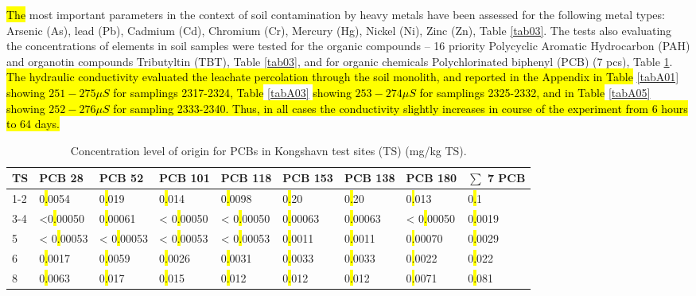 \documentclass[algorithms,article,submit,pdftex,moreauthors]{Definitions/mdpi}
\begin{document}
\hl{The} most important parameters in the context of soil contamination by heavy metals have been assessed for the following metal types: Arsenic (As), lead (Pb), Cadmium (Cd), Chromium (Cr), Mercury (Hg), Nickel (Ni), Zinc (Zn), Table \ref{tab03}. The tests also evaluating the concentrations of elements in soil samples were tested for the organic compounds -- 16 priority Polycyclic Aromatic Hydrocarbon (PAH) and organotin compounds Tributyltin (TBT), Table \ref{tab03}, and for organic chemicals Polychlorinated biphenyl (PCB) (7 pcs), Table \ref{tab04}. \hl{The hydraulic conductivity evaluated the leachate percolation through the soil monolith, and reported in the Appendix in Table} \ref{tabA01} \hl{showing $251-275 \mu S$ for samplings 2317-2324, Table} \ref{tabA03} \hl{showing $253-274 \mu S$ for samplings 2325-2332, and in Table} \ref{tabA05} \hl{showing $252-276 \mu S$ for sampling 2333-2340. Thus, in all cases the conductivity slightly increases in course of the experiment from 6 hours to 64 days.}

\begin{table}[H] 
\caption{Concentration level of origin for PCBs in Kongshavn test sites (TS) (mg/kg TS).\label{tab04}}
\begin{tabularx}{\linewidth}{p{0.5cm}p{1.3cm}p{1.3cm}p{1.3cm}p{1.3cm}p{1.2cm}p{1.2cm}p{1.3cm}p{1.3cm}}
\toprule
\textbf{TS} & \textbf{PCB 28} & \textbf{PCB 52} & \textbf{PCB 101} & \textbf{PCB 118} & \textbf{PCB 153} & \textbf{PCB 138} & \textbf{PCB 180} & \textbf{$\sum$ 7 PCB}\\
\midrule
1-2 & 0\hl{.}0054   & 0\hl{.}019     & 0\hl{.}014 	     & 0\hl{.}0098  & 0\hl{.}20     & 0\hl{.}20       & 0\hl{.}013     & 0\hl{.}1 \\
3-4 & <0\hl{.}00050 & 0\hl{.}00061 & < 0\hl{.}00050    & < 0\hl{.}00050 & 0\hl{.}00063 & 0\hl{.}00063 & < 0\hl{.}00050 & 0\hl{.}0019 \\
5 & < 0\hl{.}00053 & < 0\hl{.}00053  & < 0\hl{.}00053  & < 0\hl{.}00053 & 0\hl{.}0011   & 0\hl{.}0011     & 0\hl{.}00070     & 0\hl{.}0029 \\
6 & 0\hl{.}0017   & 0\hl{.}0059 	& 0\hl{.}0026       & 0\hl{.}0031  & 0\hl{.}0033  & 0\hl{.}0033      & 0\hl{.}0022      & 0\hl{.}022 \\
8 & 0\hl{.}0063   & 0\hl{.}017 	& 0\hl{.}015         & 0\hl{.}012     & 0\hl{.}012    & 0\hl{.}012      & 0\hl{.}0071      & 0\hl{.}081\\
\bottomrule
\end{tabularx}
\end{table}
\end{document}
